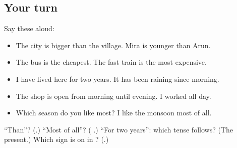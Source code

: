 \subsection*{Your turn}
Say these aloud:

\begin{itemize}
\raggedright
  \item The city is bigger than the village. Mira is younger than Arun.
  \item The bus is the cheapest. The fast train is the most expensive.
  \item I have lived here for two years. It has been raining since morning.
  \item The shop is open from morning until evening. I worked all day.
  \item Which season do you like most? I like the monsoon most of all.
\end{itemize}

\begin{tcolorbox}[breakable,colback=teal!4,colframe=teal!35!black,title={Before you move on}]
\textquotedblleft{}Than\textquotedblright{}? (\textbf{}.) \textquotedblleft{}Most of all\textquotedblright{}? (\textbf{ }.) \textquotedblleft{}For two years\textquotedblright{}: which tense follows? (The present.) Which sign is on \textbf{} in \textbf{}? (\textbf{}.)
\end{tcolorbox}
